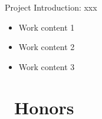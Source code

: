 \documentclass{resume}
\begin{document}
Project Introduction: xxx
\begin{itemize}[parsep=1ex]
  \item Work content 1
  \item Work content 2
  \item Work content 3
\end{itemize}

\section{\faTrophy\ Honors}
\end{document}
